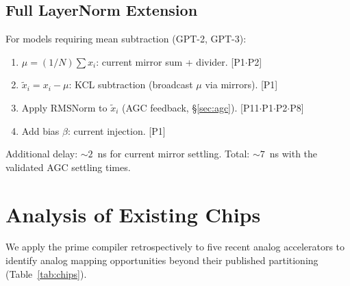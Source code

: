 \documentclass[11pt]{article}
\begin{document}
\subsection{Full LayerNorm Extension}

For models requiring mean subtraction (GPT-2, GPT-3):
\begin{enumerate}[leftmargin=*]
\item $\mu = (1/N)\sum x_i$: current mirror sum + divider. \hfill [P1$\cdot$P2]
\item $\tilde{x}_i = x_i - \mu$: KCL subtraction (broadcast $\mu$ via mirrors). \hfill [P1]
\item Apply RMSNorm to $\tilde{x}_i$ (AGC feedback, \S\ref{sec:agc}). \hfill [P11$\cdot$P1$\cdot$P2$\cdot$P8]
\item Add bias $\beta$: current injection. \hfill [P1]
\end{enumerate}

Additional delay: ${\sim}2$~ns for current mirror settling. Total: ${\sim}7$~ns with the validated AGC settling times.

\section{Analysis of Existing Chips}
\label{sec:analysis}

We apply the prime compiler retrospectively to five recent analog accelerators to identify analog mapping opportunities beyond their published partitioning (Table~\ref{tab:chips}).
\end{document}
